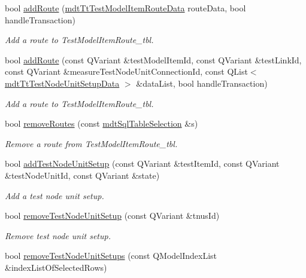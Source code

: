 \begin{DoxyCompactItemize}
bool \hyperlink{classmdt_tt_test_model_item_a376af5a1f2c0778fcd14c9c78820b1c2}{add\-Route} (\hyperlink{classmdt_tt_test_model_item_route_data}{mdt\-Tt\-Test\-Model\-Item\-Route\-Data} route\-Data, bool handle\-Transaction)
\begin{DoxyCompactList}\small\item\em Add a route to Test\-Model\-Item\-Route\-\_\-tbl. \end{DoxyCompactList}\item 
bool \hyperlink{classmdt_tt_test_model_item_a6a65e1811e99e59bb9f531e643cbb329}{add\-Route} (const Q\-Variant \&test\-Model\-Item\-Id, const Q\-Variant \&test\-Link\-Id, const Q\-Variant \&measure\-Test\-Node\-Unit\-Connection\-Id, const Q\-List$<$ \hyperlink{classmdt_tt_test_node_unit_setup_data}{mdt\-Tt\-Test\-Node\-Unit\-Setup\-Data} $>$ \&data\-List, bool handle\-Transaction)
\begin{DoxyCompactList}\small\item\em Add a route to Test\-Model\-Item\-Route\-\_\-tbl. \end{DoxyCompactList}\item 
bool \hyperlink{classmdt_tt_test_model_item_acb07969d5c19a22d8f3039f5f8c2010b}{remove\-Routes} (const \hyperlink{classmdt_sql_table_selection}{mdt\-Sql\-Table\-Selection} \&s)
\begin{DoxyCompactList}\small\item\em Remove a route from Test\-Model\-Item\-Route\-\_\-tbl. \end{DoxyCompactList}\item 
bool \hyperlink{classmdt_tt_test_model_item_acac991609d4e4b39404cf1be14928947}{add\-Test\-Node\-Unit\-Setup} (const Q\-Variant \&test\-Item\-Id, const Q\-Variant \&test\-Node\-Unit\-Id, const Q\-Variant \&state)
\begin{DoxyCompactList}\small\item\em Add a test node unit setup. \end{DoxyCompactList}\item 
bool \hyperlink{classmdt_tt_test_model_item_a6424038eadcf2e2d11ee5aa269b562c7}{remove\-Test\-Node\-Unit\-Setup} (const Q\-Variant \&tnus\-Id)
\begin{DoxyCompactList}\small\item\em Remove test node unit setup. \end{DoxyCompactList}\item 
bool \hyperlink{classmdt_tt_test_model_item_a3e6d86258dde0d8cb0fb14e9195cabd9}{remove\-Test\-Node\-Unit\-Setups} (const Q\-Model\-Index\-List \&index\-List\-Of\-Selected\-Rows)

\end{DoxyCompactItemize}
